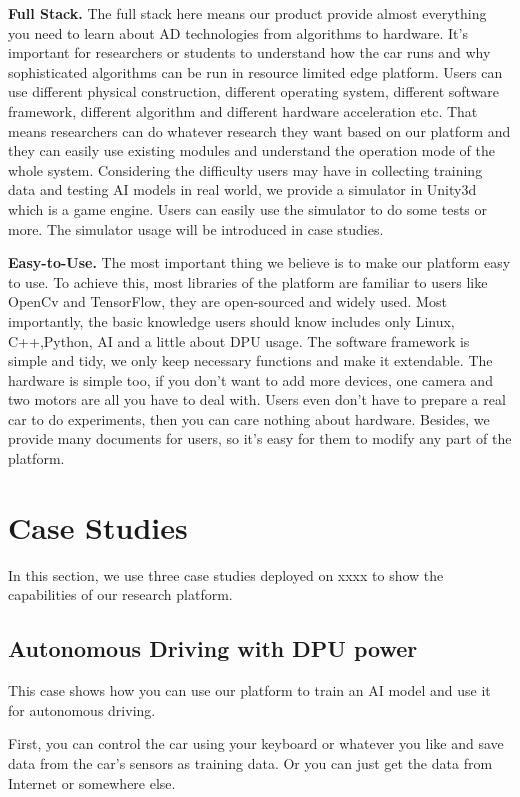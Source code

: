 \documentclass[conference]{IEEEtran}
\begin{document}
\textbf{Full Stack. }The full stack here means our product provide almost everything you need to learn about AD technologies from algorithms to hardware. It's important for researchers or students to understand how the car runs and why sophisticated algorithms can be run in resource limited edge platform. Users can use different physical construction, different operating system, different software framework, different algorithm and different hardware acceleration etc. That means researchers can do whatever research they want based on our platform and they can easily use existing modules and understand the operation mode of the whole system. Considering the difficulty users may have in collecting training data and testing AI models in real world, we provide a simulator in Unity3d which is a game engine. Users can easily use the simulator to do some tests or more. The simulator usage will be introduced in case studies.

\textbf{Easy-to-Use. }The most important thing we believe is to make our platform easy to use. To achieve this, most libraries of the platform are familiar to users like OpenCv and TensorFlow\cite{b33}, they are open-sourced and widely used. Most importantly, the basic knowledge users should know includes only Linux, C++,Python, AI and a little about DPU usage. The software framework is simple and tidy, we only keep necessary functions and make it extendable. The hardware is simple too, if you don't want to add more devices, one camera and two motors are all you have to deal with. Users even don't have to prepare a real car to do experiments, then you can care nothing about hardware. Besides, we provide many documents for users, so it's easy for them to modify any part of the platform.

\section{Case Studies}
In this section, we use three case studies deployed on xxxx to show the capabilities of our research platform.

\subsection{Autonomous Driving with DPU power}
This case shows how you can use our platform to train an AI model and use it for autonomous driving. 

First, you can control the car using your keyboard or whatever you like and save data from the car's sensors as training data. Or you can just get the data from Internet or somewhere else. 
\end{document}
